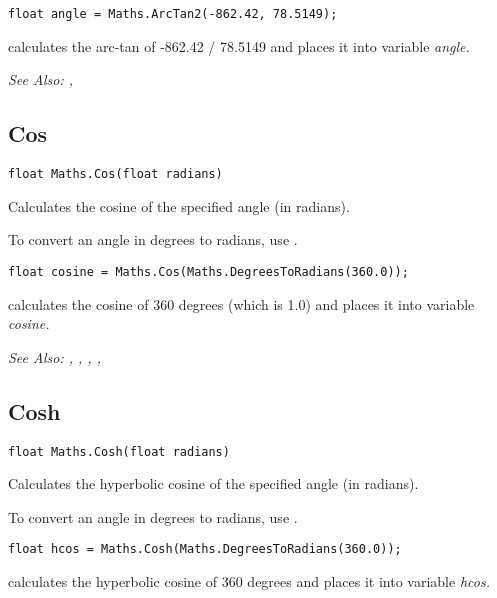 \begin{verbatim}
float angle = Maths.ArcTan2(-862.42, 78.5149);
\end{verbatim}
calculates the arc-tan of -862.42 / 78.5149 and places it into variable \it{angle}.

\it{See Also:} ,


\subsection{Cos}\label{Maths.Cos}%

\begin{verbatim}
float Maths.Cos(float radians)
\end{verbatim}
Calculates the cosine of the specified angle (in radians).

To convert an angle in degrees to radians, use .

\begin{verbatim}
float cosine = Maths.Cos(Maths.DegreesToRadians(360.0));
\end{verbatim}
calculates the cosine of 360 degrees (which is 1.0) and places it into variable \it{cosine}.

\it{See Also:} ,
, ,
, 


\subsection{Cosh}\label{Maths.Cosh}%

\begin{verbatim}
float Maths.Cosh(float radians)
\end{verbatim}
Calculates the hyperbolic cosine of the specified angle (in radians).

To convert an angle in degrees to radians, use .

\begin{verbatim}
float hcos = Maths.Cosh(Maths.DegreesToRadians(360.0));
\end{verbatim}
calculates the hyperbolic cosine of 360 degrees and places it into variable \it{hcos}.

